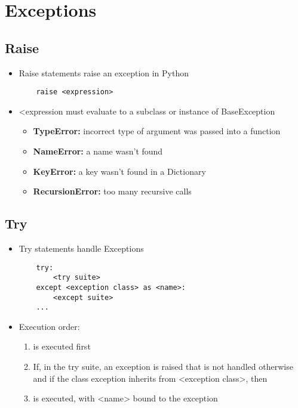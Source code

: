 \chapter{Exceptions}

\section{Raise}
\begin{itemize}
    \item Raise statements raise an exception in Python
    \begin{verbatim}
    raise <expression>
    \end{verbatim}
    \item <expression must evaluate to a subclass or instance of BaseException
    \begin{itemize}
        \item \textbf{TypeError:} incorrect type of argument was passed into a function
        \item \textbf{NameError:} a name wasn't found
        \item \textbf{KeyError:} a key wasn't found in a Dictionary
        \item \textbf{RecursionError:} too many recursive calls
    \end{itemize}
\end{itemize}

\section{Try}
\begin{itemize}
    \item Try statements handle Exceptions
    \begin{verbatim}
    try:
        <try suite>
    except <exception class> as <name>:
        <except suite>
    ...
    \end{verbatim}
    \item Execution order:
    \begin{enumerate}
        \item <try suite> is executed first
        \item If, in the try suite, an exception is raised that is not handled otherwise and if the class exception inherits from <exception class>, then
        \item <except suite> is executed, with <name> bound to the exception
    \end{enumerate}
\end{itemize}